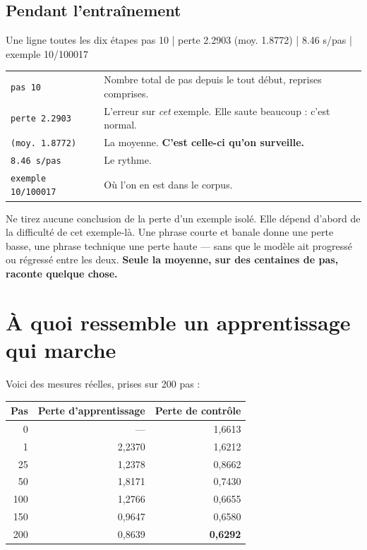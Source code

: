 \subsection{Pendant l'entraînement}

\begin{nkcode}[]{Une ligne toutes les dix étapes}
pas 10 | perte 2.2903 (moy. 1.8772) | 8.46 s/pas | exemple 10/100017
\end{nkcode}

\begin{center}
\begin{tabular}{lp{9.6cm}}
\toprule
\texttt{pas 10} & Nombre total de pas depuis le tout début, reprises
                  comprises. \\
\texttt{perte 2.2903} & L'erreur sur \emph{cet} exemple. Elle saute beaucoup :
                  c'est normal. \\
\texttt{(moy. 1.8772)} & La moyenne. \textbf{C'est celle-ci qu'on surveille.} \\
\texttt{8.46 s/pas} & Le rythme. \\
\texttt{exemple 10/100017} & Où l'on en est dans le corpus. \\
\bottomrule
\end{tabular}
\end{center}

\begin{nkpiege}
Ne tirez aucune conclusion de la perte d'un exemple isolé. Elle dépend d'abord
de la difficulté de cet exemple-là. Une phrase courte et banale donne une perte
basse, une phrase technique une perte haute — sans que le modèle ait progressé
ou régressé entre les deux. \textbf{Seule la moyenne, sur des centaines de pas,
raconte quelque chose.}
\end{nkpiege}

\section{À quoi ressemble un apprentissage qui marche}

Voici des mesures réelles, prises sur 200 pas :

\begin{center}
\begin{tabular}{rrr}
\toprule
\textbf{Pas} & \textbf{Perte d'apprentissage} & \textbf{Perte de contrôle} \\
\midrule
0   & —      & 1,6613 \\
1   & 2,2370 & 1,6212 \\
25  & 1,2378 & 0,8662 \\
50  & 1,8171 & 0,7430 \\
100 & 1,2766 & 0,6655 \\
150 & 0,9647 & 0,6580 \\
200 & 0,8639 & \textbf{0,6292} \\
\bottomrule
\end{tabular}
\end{center}

